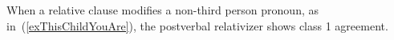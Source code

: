 \documentclass[10pt,twoside]{article}
\def\ci#1{{\ipaFont #1}}
\newcommand{\gl}[1]{`#1'}
\def\VSP{\vspace{0pt}}
\newcommand{\cl}[1]{{\sc cl#1}}
\newcommand{\pref}[1]{(\ref{#1})}
\def\elicited{$^\diamond$}
\newcommand{\comment}[1]{\textcolor{blue}{\emph{#1}}}
\begin{document}
When a relative clause modifies a non-third person pronoun, as in~\pref{exThisChildYouAre}, the postverbal relativizer shows class 1 agreement.

%
%
%
%
\end{document}
